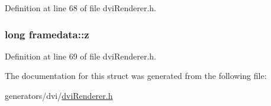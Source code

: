 Definition at line 68 of file dvi\+Renderer.\+h.

\hypertarget{structframedata_a563f47ad708ba389b24d1d89a63a7ec4}{
\subsubsection[{z}]{\setlength{\rightskip}{0pt plus 5cm}long framedata\+::z}}\label{structframedata_a563f47ad708ba389b24d1d89a63a7ec4}


Definition at line 69 of file dvi\+Renderer.\+h.



The documentation for this struct was generated from the following file\+:\begin{DoxyCompactItemize}
\item 
generators/dvi/\hyperlink{dviRenderer_8h}{dvi\+Renderer.\+h}\end{DoxyCompactItemize}
